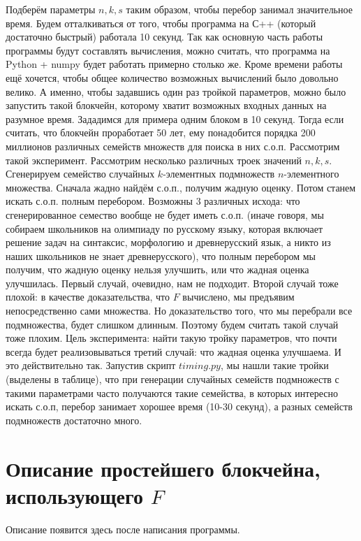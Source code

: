 \documentclass{article}
\begin{document}
    Подберём параметры $n, k, s$ таким образом, чтобы перебор занимал значительное время. Будем отталкиваться от того, чтобы программа на С++ (который достаточно быстрый) работала 10 секунд. Так как основную часть работы программы будут составлять вычисления, можно считать, что программа на Python + numpy будет работать примерно столько же.
    Кроме времени работы ещё хочется, чтобы общее количество возможных вычислений было довольно велико. А именно, чтобы задавшись один раз тройкой параметров, можно было запустить такой блокчейн, которому хватит возможных входных данных на разумное время. Зададимся для примера одним блоком в 10 секунд. Тогда если считать, что блокчейн проработает 50 лет, ему понадобится порядка 200 миллионов различных семейств множеств для поиска в них с.о.п.
    Рассмотрим такой эксперимент. Рассмотрим несколько различных троек значений $n, k, s$. Сгенерируем семейство случайных $k$-элементных подмножеств $n$-элементного множества. Сначала жадно найдём с.о.п., получим жадную оценку. Потом станем искать с.о.п. полным перебором. Возможны 3 различных исхода: что сгенерированное семество вообще не будет иметь с.о.п. (иначе говоря, мы собираем школьников на олимпиаду по русскому языку, которая включает решение задач на синтаксис, морфологию и древнерусский язык, а никто из наших школьников не знает древнерусского), что полным перебором мы получим, что жадную оценку нельзя улучшить, или что жадная оценка улучшилась.
    Первый случай, очевидно, нам не подходит. Второй случай тоже плохой: в качестве доказательства, что $F$ вычислено, мы предъявим непосредственно сами множества. Но доказательство того, что мы перебрали все подмножества, будет слишком длинным. Поэтому будем считать такой случай тоже плохим.
    Цель эксперимента: найти такую тройку параметров, что почти всегда будет реализовываться третий случай: что жадная оценка улучшаема. И это действительно так. Запустив скрипт $timing.py$, мы нашли такие тройки (выделены в таблице), что при генерации случайных семейств подмножеств с такими параметрами часто получаются такие семейства, в которых интересно искать с.о.п, перебор занимает хорошее время (10-30 секунд), а разных семейств подмножеств достаточно много.
\section{Описание простейшего блокчейна, использующего $F$}

Описание появится здесь после написания программы.
\end{document}

